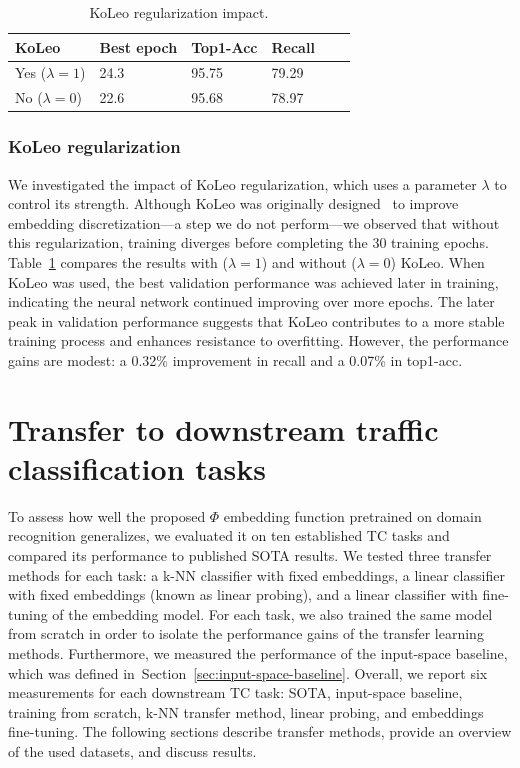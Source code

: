 \documentclass[lettersize,journal,twoside,article]{IEEEtran}
\newcommand{\secref}[1]{Section~\ref{#1}}
\newcommand{\tabref}[1]{Table~\ref{#1}}
\begin{document}
\begin{table}[h]
    \footnotesize
    \centering
    \setlength\extrarowheight{1pt}
    \caption{KoLeo regularization impact.}
    \label{tab:koleo}
    \begin{tabular}{|l|l|l|l|l|l|}
    \hline
        \textbf{KoLeo} & \textbf{Best epoch} & \textbf{Top1-Acc} & \textbf{Recall}\\ \hline
        Yes ($\lambda = 1$) & 24.3 & 95.75 & 79.29  \\ \hline
        No ($\lambda = 0$) & 22.6 & 95.68 & 78.97 \\ \hline
    \end{tabular}
\end{table}

\subsubsection{KoLeo regularization}
We investigated the impact of KoLeo regularization, which uses a parameter $\lambda$ to control its strength. Although KoLeo was originally designed~\cite{sablayrolles2019spreadingvectorssimilaritysearch} to improve embedding discretization---a step we do not perform---we observed that without this regularization, training diverges before completing the 30 training epochs. \tabref{tab:koleo} compares the results with ($\lambda=1$) and without ($\lambda=0$) KoLeo. When KoLeo was used, the best validation performance was achieved later in training, indicating the neural network continued improving over more epochs. The later peak in validation performance suggests that KoLeo contributes to a more stable training process and enhances resistance to overfitting. However, the performance gains are modest: a 0.32\% improvement in recall and a 0.07\% in top1-acc. 

\section{Transfer to downstream traffic classification tasks}
\label{sec:transfer-learning}
To assess how well the proposed $\Phi$ embedding function pretrained on domain recognition generalizes, we evaluated it on ten established TC tasks and compared its performance to published SOTA results. We tested three transfer methods for each task: a k-NN classifier with fixed embeddings, a linear classifier with fixed embeddings (known as linear probing), and a linear classifier with fine-tuning of the embedding model. For each task, we also trained the same model from scratch in order to isolate the performance gains of the transfer learning methods. Furthermore, we measured the performance of the input-space baseline, which was defined in~\secref{sec:input-space-baseline}. Overall, we report six measurements for each downstream TC task: SOTA, input-space baseline, training from scratch, k-NN transfer method, linear probing, and embeddings fine-tuning. The following sections describe transfer methods, provide an overview of the used datasets, and discuss results.
\end{document}

